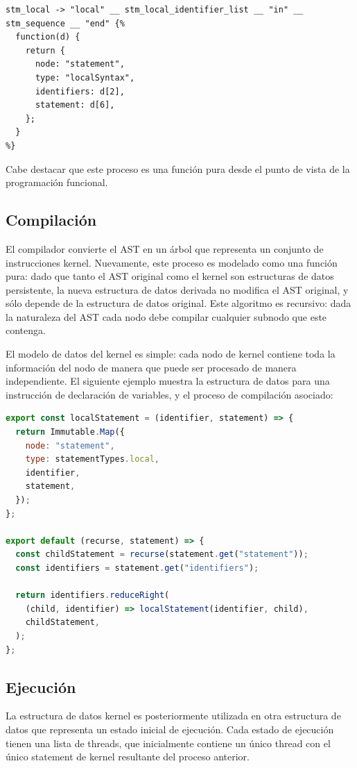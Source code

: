\documentclass[a4paper,11pt]{article}
\begin{document}
\begin{lstlisting}
stm_local -> "local" __ stm_local_identifier_list __ "in" __ stm_sequence __ "end" {%
  function(d) {
    return {
      node: "statement",
      type: "localSyntax",
      identifiers: d[2],
      statement: d[6],
    };
  }
%}
\end{lstlisting}

Cabe destacar que este proceso es una función pura desde el punto de vista de la programación funcional.

\subsection{Compilación}

El compilador convierte el AST en un árbol que representa un conjunto de instrucciones kernel. Nuevamente, este proceso es modelado como una función pura: dado que tanto el AST original como el kernel son estructuras de datos persistente\cite{persistentdatastructures}, la nueva estructura de datos derivada no modifica el AST original, y sólo depende de la estructura de datos original. Este algoritmo es recursivo: dada la naturaleza del AST cada nodo debe compilar cualquier subnodo que este contenga.

El modelo de datos del kernel es simple: cada nodo de kernel contiene toda la información del nodo de manera que puede ser procesado de manera independiente. El siguiente ejemplo muestra la estructura de datos para una instrucción de declaración de variables, y el proceso de compilación asociado:

\begin{lstlisting}[language=javascript]
export const localStatement = (identifier, statement) => {
  return Immutable.Map({
    node: "statement",
    type: statementTypes.local,
    identifier,
    statement,
  });
};

export default (recurse, statement) => {
  const childStatement = recurse(statement.get("statement"));
  const identifiers = statement.get("identifiers");

  return identifiers.reduceRight(
    (child, identifier) => localStatement(identifier, child),
    childStatement,
  );
};
\end{lstlisting}

\subsection{Ejecución}

La estructura de datos kernel es posteriormente utilizada en otra estructura de datos que representa un estado inicial de ejecución. Cada estado de ejecución tienen una lista de threads, que inicialmente contiene un único thread con el único statement de kernel resultante del proceso anterior.
\end{document}
